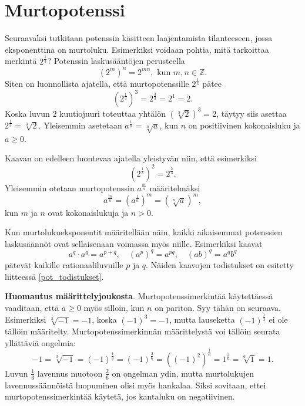 \chapter{Murtopotenssi}

Seuraavaksi tutkitaan potenssin käsitteen laajentamista tilanteeseen, jossa eksponenttina on murtoluku.
Esimerkiksi voidaan pohtia, mitä tarkoittaa merkintä $2^\frac{1}{3}$? Potenssin laskusääntöjen perusteella
\[
(2^{m})^n = 2^{mn},\textrm{ kun }m,n\in \mathbb{Z}.
\]
Siten on luonnollista ajatella, että murtopotenssille $2^\frac{1}{3}$ pätee
\[
(2^\frac{1}{3})^3 = 2^\frac{3}{3} = 2^1=2.
\]
Koska luvun $2$ kuutiojuuri toteuttaa yhtälön $(\sqrt[3]{2})^3=2$, täytyy siis asettaa $2^\frac{1}{3}=\sqrt[3]{2}$. Yleisemmin asetetaan $a^\frac{1}{n} =\sqrt[n]{a}$, kun $n$ on positiivinen kokonaisluku ja $a\ge 0$.

Kaavan on edelleen luontevaa ajatella yleistyvän niin, että esimerkiksi
\[
(2^{\frac{1}{3}})^2 = 2^{\frac{2}{3}}.
\]
Yleisemmin otetaan murtopotenssin $a^\frac{m}{n}$ määritelmäksi
\[
a^\frac{m}{n} = (a^{\frac{1}{n}})^m = (\sqrt[n]{a})^m,
\]
kun $m$ ja $n$ ovat kokonaislukuja ja $n>0$. 



Kun murtolukueksponentit määritellään näin, kaikki aikaisemmat potenssien
laskusäännöt ovat sellaisenaan voimassa myös niille. Esimerkiksi kaavat
\[ a^q\cdot a^q = a^{p+q}, \quad (a^p)^q = a^{pq}, \quad (ab)^q=a^qb^q \]
pätevät kaikille rationaaliluvuille $p$ ja $q$.  Näiden kaavojen todistukset on esitetty liitteessä \ref{pot_todistukset}.

{\bf Huomautus määrittelyjoukosta}. Murtopotenssimerkintää käytettäessä vaaditaan, että $a\geq 0$ myös silloin, kun $n$ on pariton. Syy tähän on seuraava. Esimerkiksi $\sqrt[3]{-1}=-1$, koska $(-1)^3=-1$, mutta lauseketta $(-1)^\frac{1}{3}$ ei ole tällöin määritelty. Murtopotenssimerkinnän määrittelystä voi tällöin seurata yllättäviä ongelmia:
\[
 -1 = \sqrt[3]{-1} = (-1)^\frac{1}{3} = (-1)^\frac{2}{6}
= ((-1)^2)^\frac{1}{6} = 1^\frac{1}{6} = \sqrt[6]{1} = 1. 
\]
Luvun $\frac{1}{3}$ lavennus muotoon $\frac{2}{6}$ on ongelman ydin, mutta murtolukujen lavennussäännöistä luopuminen olisi myös hankalaa. Siksi sovitaan, ettei murtopotenssimerkintää käytetä, jos kantaluku on negatiivinen.


